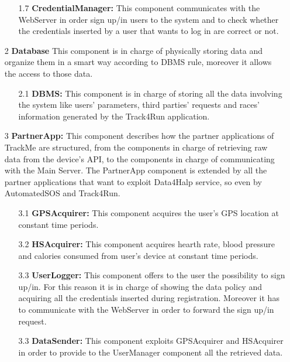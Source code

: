 \begin{enumerate}
\begin{enumerate}
	\item [1.7] \textbf{CredentialManager: } This component communicates with the WebServer in order sign up/in users to the system and to check whether the credentials inserted by a user that wants to log in are correct or not.
	
	\end{enumerate}
	
\item [2] \textbf{Database} 
This component is in charge of physically storing data and organize them in a smart way according to DBMS rule, moreover it allows the access to those data.

	\begin{enumerate}
	\item [2.1]\textbf{DBMS: }
	This component is in charge of storing all the data involving the system like users' parameters, third parties' requests and races' information generated by the Track4Run application.
	\end{enumerate}
	
\item [3]\textbf{PartnerApp: }
This component describes how the partner applications of TrackMe are structured, from the components in charge of retrieving raw data from the device's API, to the components in charge of communicating with the Main Server. The PartnerApp component is extended by all the partner applications that want to exploit Data4Halp service, so even by AutomatedSOS and Track4Run.

	\begin{enumerate}
	\item [3.1]\textbf{GPSAcquirer:}
	This component acquires the user's GPS location at constant time periods.
	
	\item [3.2]\textbf{HSAcquirer:}
	This component acquires hearth rate, blood pressure and calories consumed from user's device at constant time periods.
	
	\item [3.3]\textbf{UserLogger:}
	This component offers to the user the possibility to sign up/in. For this reason it is in charge of showing the data policy and acquiring all the credentials inserted during registration. Moreover it has to communicate with the WebServer in order to forward the sign up/in request.
	 
	\item [3.3]\textbf{DataSender:}
	This component exploits GPSAcquirer and HSAcquirer in order to provide to the UserManager component all the retrieved data.
	\end{enumerate}


\end{enumerate}
